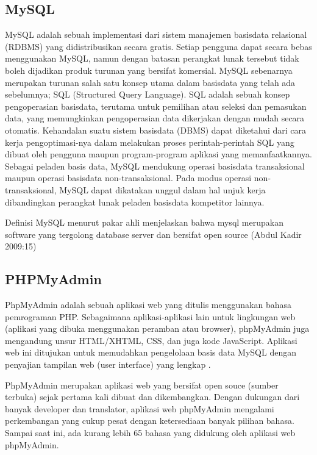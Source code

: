\documentclass{jtetiproposalskripsi}
\begin{document}
\subsection{MySQL}
MySQL adalah sebuah implementasi dari sistem manajemen basisdata relasional (RDBMS) yang didistribusikan secara gratis. Setiap pengguna dapat secara bebas menggunakan MySQL, namun dengan batasan perangkat lunak tersebut tidak boleh dijadikan produk turunan yang bersifat komersial. MySQL sebenarnya merupakan turunan salah satu konsep utama dalam basisdata yang telah ada sebelumnya; SQL (Structured Query Language). SQL adalah sebuah konsep pengoperasian basisdata, terutama untuk pemilihan atau seleksi dan pemasukan data, yang memungkinkan pengoperasian data dikerjakan dengan mudah secara otomatis. Kehandalan suatu sistem basisdata (DBMS) dapat diketahui dari cara kerja pengoptimasi-nya dalam melakukan proses perintah-perintah SQL yang dibuat oleh pengguna maupun program-program aplikasi yang memanfaatkannya. Sebagai peladen basis data, MySQL mendukung operasi basisdata transaksional maupun operasi basisdata non-transaksional. Pada modus operasi non-transaksional, MySQL dapat dikatakan unggul dalam hal unjuk kerja dibandingkan perangkat lunak peladen basisdata kompetitor lainnya.

Definisi MySQL menurut  pakar ahli menjelaskan bahwa mysql merupakan software yang tergolong database server dan bersifat  open source  (Abdul Kadir 2009:15)


\subsection{PHPMyAdmin }

PhpMyAdmin adalah sebuah aplikasi web yang ditulis menggunakan bahasa pemrograman PHP. Sebagaimana aplikasi-aplikasi lain untuk lingkungan web (aplikasi yang dibuka menggunakan peramban atau browser), phpMyAdmin juga mengandung unsur HTML/XHTML, CSS, dan juga kode JavaScript. Aplikasi web ini ditujukan untuk memudahkan pengelolaan basis data MySQL dengan penyajian tampilan web (user interface) yang lengkap . 

PhpMyAdmin merupakan aplikasi web yang bersifat open souce (sumber terbuka) sejak pertama kali dibuat dan dikembangkan. Dengan dukungan dari banyak developer dan translator, aplikasi web phpMyAdmin mengalami perkembangan yang cukup pesat dengan ketersediaan banyak pilihan bahasa. Sampai saat ini, ada kurang lebih 65 bahasa yang didukung oleh aplikasi web phpMyAdmin.
\end{document}
